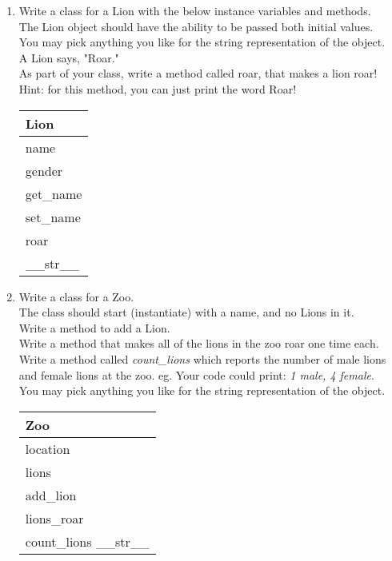 



	\item
	\begin{enumerate}
		\item
			Write a class for a Lion with the below instance variables and methods.\\ 
			The Lion object should have the ability to be passed both initial values.\\  
			You may pick anything you like for the string representation of the object.\\
			A Lion says, "Roar."\\  
			As part of your class, write a method called roar, that makes a lion roar!\\
			Hint: for this method, you can just print the word Roar!
			\begin{flushright}
			\begin{tabular}{|l|}
				\hline
				Lion\\ \hline
				name\\	gender\\	 \hline
				get\_name \\ set\_name \\ roar \\ \_\_str\_\_ \\ \hline
			\end{tabular}
			\end{flushright}

		\item
			Write a class for a Zoo. \\
			The class should start (instantiate) with a name, and no Lions in it. \\ 
			Write a method to add a Lion.\\
			Write a method that makes all of the lions in the zoo roar one time each.\\
			Write a method called \textit{count\_lions} which reports the number of male 
			lions and female lions at the zoo. eg. Your code could print: \textit{1 male, 4 female}.\\
			You may pick anything you like for the string representation of the object.
	
			\begin{flushright}
			\begin{tabular}{|l|}
				\hline
				Zoo\\ \hline  	%
				location\\ lions\\ \hline		%
				add\_lion\\ lions\_roar \\ count\_lions \_\_str\_\_ \\ \hline		%
			\end{tabular}
			\end{flushright}


\end{enumerate}
